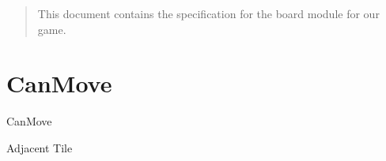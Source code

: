 \documentclass[a4paper,twoside,11pt]{article}
\begin{document}
\begin{abstract}
  This document contains the specification for the board module for our game.
\end{abstract}

\section{CanMove} %
\label{sec:canmove}

\begin{class}{CanMove}
  
  \begin{schema}{Adjacent Tile}
    
  \end{schema}
\end{class}

\end{document}

